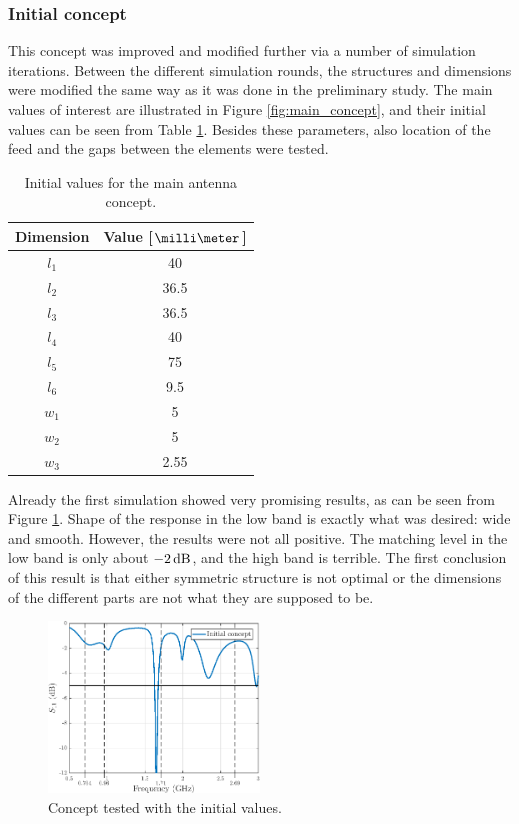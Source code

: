\subsubsection{Initial concept}
\label{sec:initial_concept}
This concept was improved and modified further via a number of simulation iterations. Between the different simulation rounds, the structures and dimensions were modified the same way as it was done in the preliminary study. The main values of interest are illustrated in Figure \ref{fig:main_concept}, and their initial values can be seen from Table \ref{tab:initial_concept}. Besides these parameters, also location of the feed and the gaps between the elements were tested. 
\begin{table}[H]
    \centering
    \caption{Initial values for the main antenna concept.}
    \label{tab:initial_concept}
    \begin{tabular}{|c|c|}
        \hline
        \textbf{Dimension} & \textbf{Value [$\milli\meter$]} \\
        \hline
        $l_1$ & 40\\
        \hline
        $l_2$ & 36.5\\
        \hline
        $l_3$ & 36.5\\
        \hline
        $l_4$ & 40\\
        \hline
        $l_5$ & 75\\
        \hline
        $l_6$ & 9.5\\
        \hline
        $w_1$ & 5\\
        \hline
        $w_2$ & 5\\
        \hline
        $w_3$ & 2.55\\
        \hline
    \end{tabular}
\end{table}

Already the first simulation showed very promising results, as can be seen from Figure \ref{fig:concept_ini}. Shape of the response in the low band is exactly what was desired: wide and smooth. However, the results were not all positive. The matching level in the low band is only about $-2\,\mathrm{dB}$, and the high band is terrible. The first conclusion of this result is that either symmetric structure is not optimal or the dimensions of the different parts are not what they are supposed to be.
\begin{figure}[H]
    \centering
    \includegraphics[width=0.5\textwidth]{img/concept_ini.eps}
    \caption{Concept tested with the initial values.}
    \label{fig:concept_ini}
\end{figure}


